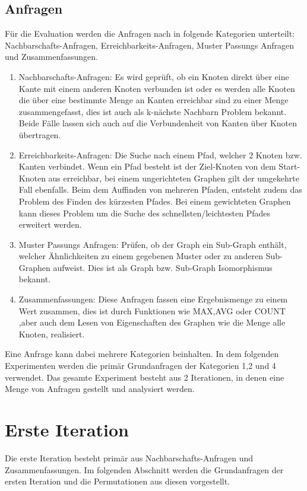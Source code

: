 \subsection{Anfragen}
Für die Evaluation werden die Anfragen nach  \parencite{angles2012comparison}  in folgende Kategorien unterteilt: Nachbarschafts-Anfragen, Erreichbarkeits-Anfragen, Muster Passungs Anfragen und  Zusammenfassungen. 
\begin{enumerate}
	\item Nachbarschafts-Anfragen: Es wird geprüft, ob ein Knoten direkt über eine  Kante mit einem anderen Knoten verbunden ist oder  es werden alle Knoten die über eine bestimmte Menge an Kanten erreichbar sind zu einer Menge zusammengefasst, dies ist auch als k-nächste Nachbarn Problem bekannt. Beide Fälle lassen sich auch auf die Verbundenheit von Kanten über Knoten übertragen.
	\item Erreichbarkeits-Anfragen: Die Suche nach einem Pfad, welcher 2 Knoten bzw. Kanten verbindet. Wenn ein Pfad besteht ist der Ziel-Knoten von dem Start-Knoten aus erreichbar, bei einem ungerichteten Graphen gilt der umgekehrte Fall ebenfalls. Beim dem Auffinden von mehreren Pfaden, entsteht zudem das Problem des Finden des kürzesten Pfades. Bei einem gewichteten Graphen kann dieses Problem um die Suche des schnellsten/leichtesten Pfades  erweitert werden. 
	\item Muster Passungs Anfragen: Prüfen, ob der Graph ein Sub-Graph enthält, welcher Ähnlichkeiten zu einem gegebenen Muster oder zu anderen Sub-Graphen aufweist. Dies ist als Graph bzw. Sub-Graph Isomorphismus bekannt. 
	\item Zusammenfassungen: Diese Anfragen fassen eine Ergebnismenge zu einem Wert zusammen, dies ist durch Funktionen wie MAX,AVG oder COUNT ,aber auch dem Lesen von Eigenschaften des Graphen wie die Menge alle Knoten, realisiert. 
\end{enumerate}
Eine Anfrage kann dabei mehrere Kategorien beinhalten. In dem folgenden Experimenten werden die primär Grundanfragen der Kategorien 1,2 und 4 verwendet. Das gesamte Experiment besteht aus 2 Iterationen, in denen eine Menge von Anfragen gestellt und analysiert werden. 
\section{Erste Iteration}
Die erste Iteration besteht primär aus Nachbarschafts-Anfragen und Zusammenfassungen. Im folgenden Abschnitt werden die Grundanfragen der ersten Iteration und die Permutationen aus diesen vorgestellt. 
